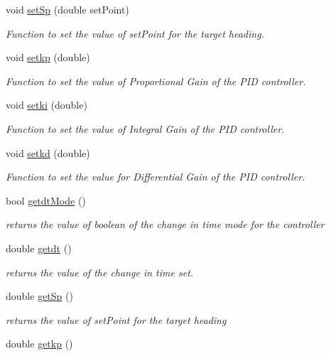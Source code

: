 \begin{DoxyCompactItemize}
void \hyperlink{classpid_a08673f8deebcfd4ff97c7794739a1a5a}{set\+Sp} (double set\+Point)
\begin{DoxyCompactList}\small\item\em Function to set the value of set\+Point for the target heading. \end{DoxyCompactList}\item 
void \hyperlink{classpid_a4ceef80aa2e2e6dc49eead967c288f26}{setkp} (double)
\begin{DoxyCompactList}\small\item\em Function to set the value of Proportional Gain of the P\+ID controller. \end{DoxyCompactList}\item 
void \hyperlink{classpid_a98faeb432f25a5729fc8a48ade1ed6de}{setki} (double)
\begin{DoxyCompactList}\small\item\em Function to set the value of Integral Gain of the P\+ID controller. \end{DoxyCompactList}\item 
void \hyperlink{classpid_ae062827b4cb59a99e941d23cca3eb677}{setkd} (double)
\begin{DoxyCompactList}\small\item\em Function to set the value for Differential Gain of the P\+ID controller. \end{DoxyCompactList}\item 
bool \hyperlink{classpid_a2c94e73a942950ebefe98863bb391cbf}{getdt\+Mode} ()
\begin{DoxyCompactList}\small\item\em returns the value of boolean of the change in time mode for the controller \end{DoxyCompactList}\item 
double \hyperlink{classpid_a9b541ca0e6644a20c89d4c84922cf63a}{getdt} ()
\begin{DoxyCompactList}\small\item\em returns the value of the change in time set. \end{DoxyCompactList}\item 
double \hyperlink{classpid_a7c38309ebf1be92157ca45103ca15c6a}{get\+Sp} ()
\begin{DoxyCompactList}\small\item\em returns the value of set\+Point for the target heading \end{DoxyCompactList}\item 
double \hyperlink{classpid_a019f96dceec59007fa9823f56e8e9dd1}{getkp} ()

\end{DoxyCompactItemize}
